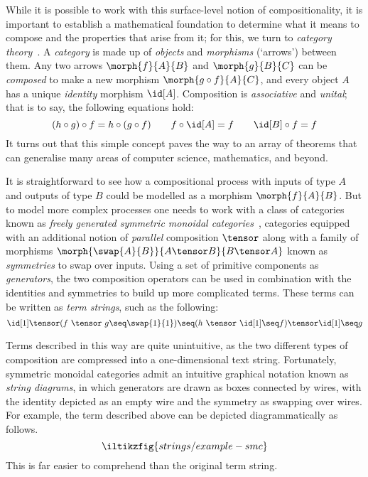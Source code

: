 While it is possible to work with this surface-level notion of
compositionality, it is important to establish a mathematical
foundation to determine what it means to compose and the properties that
arise from it; for this, we turn to
\emph{category theory}~\cite{maclane1978categories}.
A \emph{category} is made up of \emph{objects} and \emph{morphisms} (`arrows')
between them.
Any two arrows \(\morph{f}{A}{B}\) and \(\morph{g}{B}{C}\) can be
\emph{composed} to  make a new morphism \(\morph{g \circ f}{A}{C}\), and every
object \(A\) has a unique \emph{identity} morphism \(\id[A]\).
Composition is \emph{associative} and \emph{unital}; that is to say, the
following equations hold:
\[
    (h \circ g) \circ f = h \circ (g \circ f)
    \qquad
    f \circ \id[A] = f
    \qquad
    \id[B] \circ f = f
\]
It turns out that this simple concept paves the way to an array of
theorems that can generalise many areas of computer science, mathematics, and
beyond.

It is straightforward to see how a compositional process with inputs of type
\(A\) and outputs of type \(B\) could be modelled as a morphism
\(\morph{f}{A}{B}\).
But to model more complex processes one needs to work with a class of categories
known as
\emph{freely generated symmetric monoidal categories}~\cite{maclane1963natural},
categories equipped with an additional notion of \emph{parallel} composition
\(\tensor\) along with a family of morphisms
\(\morph{\swap{A}{B}}{A\tensor B}{B \tensor A}\) known as \emph{symmetries} to
swap over inputs.
Using a set of primitive components as \emph{generators}, the two composition
operators can be used in combination with the identities and symmetries to build
up more complicated terms.
These terms can be written as \emph{term strings}, such as the following:
\[
    \id[1]
    \tensor
    (f\ \tensor\ g
    \seq
    \swap{1}{1}
    )
    \seq
    (h\ \tensor\ \id[1] \seq f)
    \tensor
    \id[1]
    \seq
    g
\]

Terms described in this way are quite unintuitive, as the two different types of
composition are compressed into a one-dimensional text string.
Fortunately, symmetric monoidal categories admit an intuitive graphical notation
known as \emph{string diagrams}, in which generators are drawn as boxes
connected by wires, with the identity depicted as an empty wire and the symmetry
as swapping over wires.
For example, the term described above can be depicted diagrammatically as
follows.
\[
    \iltikzfig{strings/example-smc}
\]
This is far easier to comprehend than the original term string.

